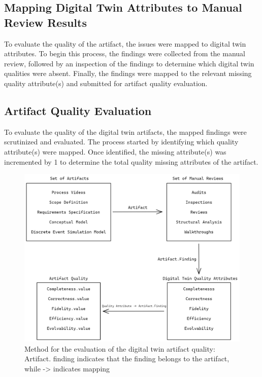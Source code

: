 \documentclass{llncs}
\begin{document}
    \subsection{Mapping Digital Twin Attributes to Manual Review Results}
    To evaluate the quality of the artifact, the issues were mapped to digital twin attributes. 
    To begin this process, the findings were collected from the manual review, followed by an inspection of the findings to determine which digital twin qualities were absent. 
    Finally, the findings were mapped to the relevant missing quality attribute(s) and submitted for artifact quality evaluation. 
    
    \subsection{Artifact Quality Evaluation}
    To evaluate the quality of the digital twin artifacts, the mapped findings were scrutinized and evaluated. 
    The process started by identifying which quality attribute(s) were mapped. 
    Once identified, the missing attribute(s) was incremented by 1 to determine the total quality missing attributes of the artifact. 
    
    \begin{figure}[htbp]
        \includegraphics[scale = 0.35]{RequirementSpecifications.png}
        \caption{Method for the evaluation of the digital twin artifact quality: Artifact. finding indicates that the finding belongs to the artifact, while -> indicates mapping}
        \label{fig:Method}
    \end{figure}
    
\end{document}
